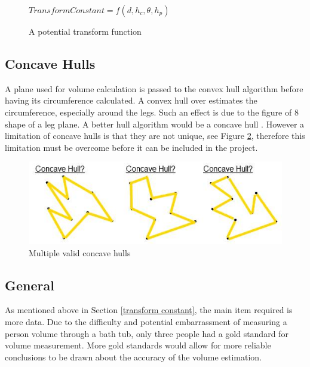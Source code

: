 \begin{figure}[h]
    \begin{center}
      $Transform Constant = f(d,h_c,\theta,h_p)$
    \end{center}
    \caption{A potential transform function}
    \label{a potential transform function}
\end{figure}

\subsection{Concave Hulls}
A plane used for volume calculation is passed to the convex hull algorithm before having its circumference calculated. A convex hull over estimates the circumference, especially around the legs. Such an effect is due to the figure of 8 shape of a leg plane. A better hull algorithm would be a concave hull \cite{moreira2007}. However a limitation of concave hulls is that they are not unique, see Figure \ref{multiple valid concave hulls}, therefore this limitation must be overcome before it can be included in the project.\\

\begin{figure}[h]
\begin{center}
\includegraphics[scale=0.6]{images/concave}
\end{center}
\caption{Multiple valid concave hulls}
\label{multiple valid concave hulls}
\end{figure}


\subsection{General}
As mentioned above in Section \ref{transform constant}, the main item required is more data. Due to the difficulty and potential embarrassment of measuring a person volume through a bath tub, only three people had a gold standard for volume measurement. More gold standards would allow for more reliable conclusions to be drawn about the accuracy of the volume estimation.\\

